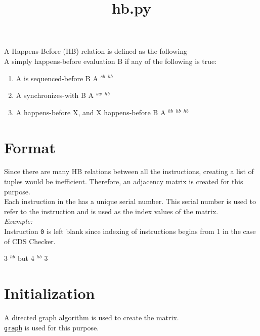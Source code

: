 \documentclass{article}
\date{}
\newcommand{\class}[1]{\color{DarkOrchid}\texttt{#1}\color{black}}
\newcommand{\seqb}[2]{{#1} {\color{Blue}\rightarrow$^{sb}$} \color{black}{#2} }
\newcommand{\sw}[2]{{#1} {\color{Blue}\rightarrow$^{sw}$} \color{black}{#2} }
\newcommand{\hb}[2]{{#1} {\color{OliveGreen}\rightarrow$^{hb}$} \color{black}{#2}}
\begin{document}
\title{hb.py}
\maketitle

A Happens-Before (HB) relation is defined as the following\\
A simply happens-before evaluation B if any of the following is true:
\begin{enumerate}
    \item A is sequenced-before B
    \newline
    \seqb{A}{B} \implies \hb{A}{B}
    \item A synchronizes-with B
    \newline
    \sw{A}{B} \implies \hb{A}{B}
    \item A happens-before X, and X happens-before B
    \newline
    \hb{\hb{A}{X}}{B} \implies \hb{A}{B}
\end{enumerate} 

\section{Format}
Since there are many HB relations between all the instructions, creating a list of tuples would be inefficient. Therefore, an adjacency matrix is created for this purpose.\\

Each instruction in the has a unique serial number. This serial number is used to refer to the instruction and is used as the index values of the matrix.\\
\textit{Example:}\\

Instruction \texttt{0} is left blank since indexing of instructions begins from 1 in the case of CDS Checker.

\hb{3}{4} but 4 \color{OliveGreen}\not\to$^{hb}$\color{black} 3

\section{Initialization}
A directed graph algorithm is used to create the matrix.\\
\href{graph.tex}{\class{graph}} is used for this purpose.\\
\end{document}

